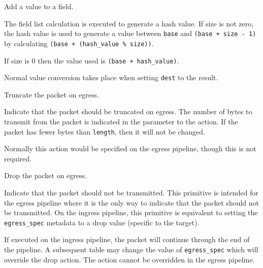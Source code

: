 \documentclass[12pt]{article}
\begin{document}

{ %
Add a value to a field.
}
{ %
}
{ %
The field list calculation is executed to generate a hash value.  If size 
is not zero, the hash value is used to generate a value between \texttt{base} and 
\texttt{(base + size - 1)} by calculating \texttt{(base + (hash_value \% size))}.  

If size is 0 then the value used is \texttt{(base + hash_value)}.

Normal value conversion takes place when setting \texttt{dest} to the result.
}


{ %
Truncate the packet on egress.
}
{ %
}
{ %
Indicate that the packet should be truncated on egress.  The number of bytes 
to transmit from the packet is indicated in the parameter to the action.  If 
the packet has fewer bytes than \texttt{length}, then it will not be changed.

Normally this action would be specified on the egress pipeline, though this 
is not required.
}


{ %
Drop the packet on egress.
}
{ %
}
{ %
Indicate that the packet should not be transmitted. This primitive is intended 
for the egress pipeline where it is the only way to indicate that the packet 
should not be transmitted. On the ingress pipeline, this primitive is equivalent 
to setting the \texttt{egress_spec} metadata to a drop value (specific to the target). 


If executed on the ingress pipeline, the packet will continue through the 
end of the pipeline. A subsequent table may change the value of \texttt{egress_spec} which 
will override the drop action. The action cannot be overridden in the egress 
pipeline.
}
\end{document}
